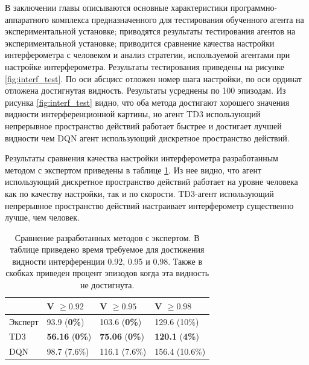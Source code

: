 В заключении главы описываются основные характеристики программно-аппаратного комплекса предназначенного для тестирования обученного агента на экспериментальной установке; приводятся результаты тестирования агентов на экспериментальной установке; приводится сравнение качества настройки интерферометра с человеком и анализ стратегии, используемой агентами при настройке интерферометра. Результаты тестирования приведены на рисунке \ref{fig:interf_test}. По оси абсцисс отложен номер шага настройки, по оси ординат отложена достигнутая видность. Результаты усреднены по 100 эпизодам. Из рисунка \ref{fig:interf_test} видно, что оба метода достигают хорошего значения видности интерференционной картины, но агент TD3 использующий непрерывное пространство действий работает быстрее и достигает лучшей видности чем DQN агент использующий дискретное пространство действий. 

Результаты сравнения качества настройки интерферометра разработанным методом с экспертом приведены в таблице \ref{tab:human}. Из нее видно, что агент использующий дискретное пространство действий работает на уровне человека как по качеству настройки, так и по скорости. TD3-агент использующий непрерывное пространство действий настраивает интерферометр существенно лучше, чем человек. 

\begin{table} [htbp]
    \centering
    \begin{threeparttable}
        \caption{Сравнение разработанных методов с экспертом. В таблице приведено время требуемое для достижения видности интерференции 0.92, 0.95 и 0.98. Также в скобках приведен процент эпизодов когда эта видность не достигнута.}
        \label{tab:human}
        \begin{tabular}{| p{2.5cm} || p{2.5cm} | p{2.5cm} | p{2.5cm} |}
            \hline
            \hline
            &V $\ge 0.92$ & V $\ge 0.95$ & V $\ge 0.98$\\
            \hline
            Эксперт &  93.9 (\textbf{0\%})  & 103.6 (\textbf{0\%}) & 129.6 (10\%)\\
            TD3 &  \textbf{56.16} (\textbf{0\%}) & \textbf{75.06} (\textbf{0\%}) & \textbf{120.1} (\textbf{4\%})\\
            DQN &  98.7 (7.6\%) & 116.1 (7.6\%) & 156.4 (10.6\%)\\
            \hline
            \hline
        \end{tabular}
    \end{threeparttable}
\end{table}


